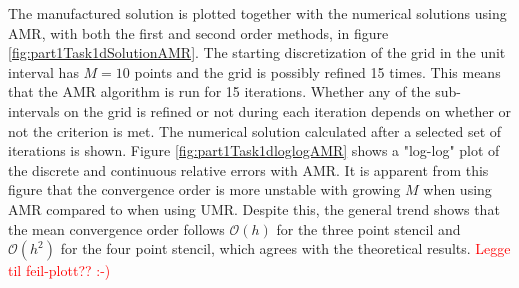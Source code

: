 The manufactured solution is plotted together with the numerical solutions using AMR, with both the first and second order methods, in figure \ref{fig:part1Task1dSolutionAMR}. The starting discretization of the grid in the unit interval has $M = 10$ points and the grid is possibly refined 15 times. This means that the AMR algorithm is run for 15 iterations. Whether any of the sub-intervals on the grid is refined or not during each iteration depends on whether or not the criterion is met. The numerical solution calculated after a selected set of iterations is shown. Figure \ref{fig:part1Task1dloglogAMR} shows a "log-log" plot of the discrete and continuous relative errors with AMR. It is apparent from this figure that the convergence order is more unstable with growing $M$ when using AMR compared to when using UMR. Despite this, the general trend shows that the mean convergence order follows $\mathcal{O}(h)$ for the three point stencil and $\mathcal{O}(h^2)$ for the four point stencil, which agrees with the theoretical results. \textcolor{red}{Legge til feil-plott?? :-)}

